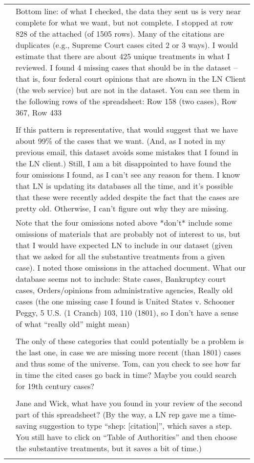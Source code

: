 \documentclass[10pt, letterpaper]{article}
\begin{document}
\begin{spacing}{1.0}
\begin{longtable}{p{1.5in}p{5in}}
    & Bottom line: of what I checked, the data they sent us is very near complete for what we want, but not complete. I stopped at row 828 of the attached (of 1505 rows). Many of the citations are duplicates (e.g., Supreme Court cases cited 2 or 3 ways). I would estimate that there are about 425 unique treatments in what I reviewed. I found 4 missing cases that should be in the dataset – that is, four federal court opinions that are shown in the LN Client (the web service) but are not in the dataset. You can see them in the following rows of the spreadsheet:
    Row 158 (two cases), Row 367, Row 433\\\\
    
    & If this pattern is representative, that would suggest that we have about 99\% of the cases that we want. (And, as I noted in my previous email, this dataset avoids some mistakes that I found in the LN client.) Still, I am a bit disappointed to have found the four omissions I found, as I can’t see any reason for them. I know that LN is updating its databases all the time, and it’s possible that these were recently added despite the fact that the cases are pretty old. Otherwise, I can’t figure out why they are missing.\\
    
    & Note that the four omissions noted above *don’t* include some omissions of materials that are probably not of interest to us, but that I would have expected LN to include in our dataset (given that we asked for all the substantive treatments from a given case). I noted those omissions in the attached document. What our database seems not to include:
    State cases, Bankruptcy court cases, Orders/opinions from administrative agencies, Really old cases (the one missing case I found is United States v. Schooner Peggy, 5 U.S. (1 Cranch) 103, 110 (1801), so I don’t have a sense of what “really old” might mean)\\\\
    
    & The only of these categories that could potentially be a problem is the last one, in case we are missing more recent (than 1801) cases and thus some of the universe. Tom, can you check to see how far in time the cited cases go back in time? Maybe you could search for 19th century cases?\\\\
    
    & Jane and Wick, what have you found in your review of the second part of this spreadsheet? (By the way, a LN rep gave me a time-saving suggestion to type “shep: [citation]”, which saves a step. You still have to click on “Table of Authorities” and then choose the substantive treatments, but it saves a bit of time.)\\\\
    



\end{longtable}
\end{spacing}
\end{document}

